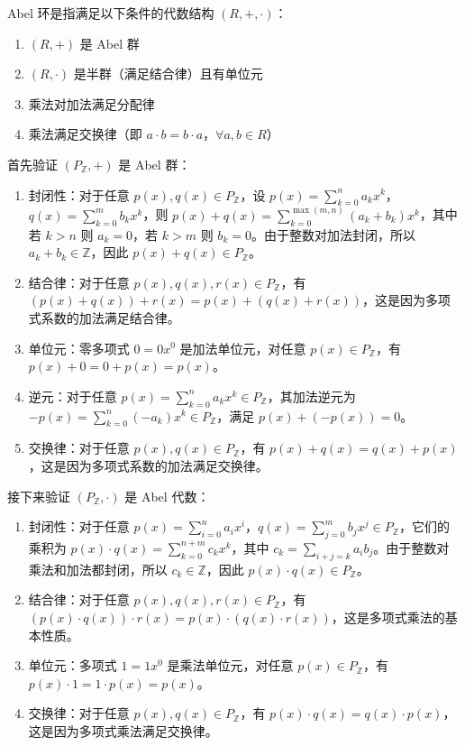 \begin{definition}[Abel 环]
Abel 环是指满足以下条件的代数结构 $(R,+,\cdot)$：
	\begin{enumerate}
		\item $(R,+)$ 是 Abel 群
		\item $(R,\cdot)$ 是半群（满足结合律）且有单位元
		\item 乘法对加法满足分配律
		\item 乘法满足交换律（即 $a \cdot b = b \cdot a$，$\forall a,b \in R$）
	\end{enumerate}
\end{definition}
首先验证 $(P_{\mathbb{Z}},+)$ 是 Abel 群：

\begin{enumerate}
	\item 封闭性：对于任意 $p(x), q(x) \in P_{\mathbb{Z}}$，设 $p(x) = \sum_{k=0}^{n}a_{k}x^{k}$，$q(x) = \sum_{k=0}^{m}b_{k}x^{k}$，则 $p(x) + q(x) = \sum_{k=0}^{\max(m,n)}(a_k + b_k)x^k$，其中若 $k > n$ 则 $a_k = 0$，若 $k > m$ 则 $b_k = 0$。由于整数对加法封闭，所以 $a_k + b_k \in \mathbb{Z}$，因此 $p(x) + q(x) \in P_{\mathbb{Z}}$。
	\item 结合律：对于任意 $p(x), q(x), r(x) \in P_{\mathbb{Z}}$，有 $(p(x) + q(x)) + r(x) = p(x) + (q(x) + r(x))$，这是因为多项式系数的加法满足结合律。
	\item 单位元：零多项式 $0 = 0x^0$ 是加法单位元，对任意 $p(x) \in P_{\mathbb{Z}}$，有 $p(x) + 0 = 0 + p(x) = p(x)$。
	\item 逆元：对于任意 $p(x) = \sum_{k=0}^{n}a_{k}x^{k} \in P_{\mathbb{Z}}$，其加法逆元为 $-p(x) = \sum_{k=0}^{n}(-a_{k})x^{k} \in P_{\mathbb{Z}}$，满足 $p(x) + (-p(x)) = 0$。
	\item 交换律：对于任意 $p(x), q(x) \in P_{\mathbb{Z}}$，有 $p(x) + q(x) = q(x) + p(x)$，这是因为多项式系数的加法满足交换律。
\end{enumerate}

接下来验证 $(P_{\mathbb{Z}},\cdot)$ 是 Abel 代数：

\begin{enumerate}
	\item 封闭性：对于任意 $p(x) = \sum_{i=0}^{n}a_{i}x^{i}$，$q(x) = \sum_{j=0}^{m}b_{j}x^{j} \in P_{\mathbb{Z}}$，它们的乘积为 $p(x) \cdot q(x) = \sum_{k=0}^{n+m}c_k x^k$，其中 $c_k = \sum_{i+j=k}a_i b_j$。由于整数对乘法和加法都封闭，所以 $c_k \in \mathbb{Z}$，因此 $p(x) \cdot q(x) \in P_{\mathbb{Z}}$。
	\item 结合律：对于任意 $p(x), q(x), r(x) \in P_{\mathbb{Z}}$，有 $(p(x) \cdot q(x)) \cdot r(x) = p(x) \cdot (q(x) \cdot r(x))$，这是多项式乘法的基本性质。
	\item 单位元：多项式 $1 = 1x^0$ 是乘法单位元，对任意 $p(x) \in P_{\mathbb{Z}}$，有 $p(x) \cdot 1 = 1 \cdot p(x) = p(x)$。
	\item 交换律：对于任意 $p(x), q(x) \in P_{\mathbb{Z}}$，有 $p(x) \cdot q(x) = q(x) \cdot p(x)$，这是因为多项式乘法满足交换律。
\end{enumerate}

